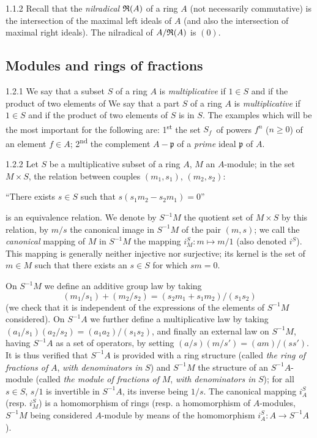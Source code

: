 \documentclass{book}
\begin{document}
\begin{env}{1.1.2}
\label{env-0.1.1.2}
Recall that the \emph{nilradical} $\mathfrak{R}(A)$ of a ring $A$ (not necessarily commutative) is the
intersection of the maximal left ideals of $A$ (and also the intersection of maximal
right ideals). The nilradical of $A/\mathfrak{R}(A)$ is $(0)$.
\end{env}

\subsection{Modules and rings of fractions}
\label{0-prelim-1.2}

\begin{env}{1.2.1}
\label{env-0.1.2.1}
We say that a subset $S$ of a ring $A$ is \emph{multiplicative} if $1\in S$ and if the product of two elements of
We say that a part $S$ of a ring $A$ is \emph{multiplicative} if $1\in S$ and if the product of two elements of
$S$ is in $S$. The examples which will be the most important for the following are:
1\textsuperscript{st} the set $S_f$ of powers $f^n$ ($n\geq 0$) of an element $f\in A$;
2\textsuperscript{nd} the complement $A-\mathfrak{p}$ of a \emph{prime} ideal $\mathfrak{p}$ of $A$.
\end{env}

\begin{env}{1.2.2}
\label{env-0.1.2.2}
Let $S$ be a multiplicative subset of a ring $A$, $M$ an $A$-module; in the set $M\times S$, the relation between
couples $(m_1,s_1)$, $(m_2,s_2)$:
\begin{center}
   ``There exists $s\in S$ such that $s(s_1 m_2-s_2 m_1)=0$''
\end{center}
is an equivalence relation. We denote by $S^{-1}M$ the quotient set of $M\times S$ by this relation, by $m/s$ the canonical
image in $S^{-1}M$ of the pair $(m,s)$; we call the \emph{canonical} mapping of $M$ in $S^{-1}M$ the mapping $i_M^S\colon m\mapsto m/1$
(also denoted $i^S$). This mapping is generally neither injective nor surjective; its kernel is the set of $m\in M$ such that there
exists an $s\in S$ for which $sm=0$.

On $S^{-1}M$ we define an additive group law by taking
\[
  (m_1/s_1)+(m_2/s_2)=(s_2 m_1+s_1 m_2)/(s_1 s_2)
\]
(we check that it is independent of the expressions of the elements of $S^{-1}M$ considered). On $S^{-1}A$ we further define
a multiplicative law by taking $(a_1/s_1)(a_2/s_2)=(a_1 a_2)/(s_1 s_2)$, and finally an external law on $S^{-1}M$, having
$S^{-1}A$ as a set of operators, by setting $(a/s)(m/s')=(am)/(ss')$. It is thus verified that $S^{-1}A$ is provided with a
ring structure (called \emph{the ring of fractions of} $A$, \emph{with denominators in} $S$) and $S^{-1}M$ the structure of
an $S^{-1}A$-module (called \emph{the  module of fractions of} $M$, \emph{with denominators in} $S$); for all $s\in S$,
$s/1$ is invertible in $S^{-1}A$, its inverse being $1/s$. The canonical mapping $i_A^S$ (resp. $i_M^S$) is a homomorphism
of rings (resp. a homomorphism of $A$-modules, $S^{-1}M$ being considered $A$-module by means of the homomorphism
$i_A^S\colon A\to S^{-1}A$).
\end{env}
\end{document}
